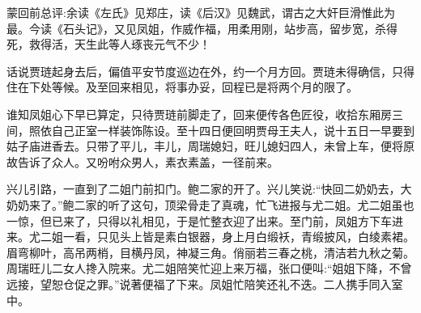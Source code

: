 

\begin{parag}
    \begin{note}蒙回前总评:余读《左氏》见郑庄，读《后汉》见魏武，谓古之大奸巨滑惟此为最。今读《石头记》，又见凤姐，作威作福，用柔用刚，站步高，留步宽，杀得死，救得活，天生此等人琢丧元气不少！\end{note}
\end{parag}


\begin{parag}
    话说贾琏起身去后，偏值平安节度巡边在外，约一个月方回。贾琏未得确信，只得住在下处等候。及至回来相见，将事办妥，回程已是将两个月的限了。
\end{parag}


\begin{parag}
    谁知凤姐心下早已算定，只待贾琏前脚走了，回来便传各色匠役，收拾东厢房三间，照依自己正室一样装饰陈设。至十四日便回明贾母王夫人，说十五日一早要到姑子庙进香去。只带了平儿，丰儿，周瑞媳妇，旺儿媳妇四人，未曾上车，便将原故告诉了众人。又吩咐众男人，素衣素盖，一径前来。
\end{parag}


\begin{parag}
    兴儿引路，一直到了二姐门前扣门。鲍二家的开了。兴儿笑说:“快回二奶奶去，大奶奶来了。”鲍二家的听了这句，顶梁骨走了真魂，忙飞进报与尤二姐。尤二姐虽也一惊，但已来了，只得以礼相见，于是忙整衣迎了出来。至门前，凤姐方下车进来。尤二姐一看，只见头上皆是素白银器，身上月白缎袄，青缎披风，白绫素裙。眉弯柳叶，高吊两梢，目横丹凤，神凝三角。俏丽若三春之桃，清洁若九秋之菊。周瑞旺儿二女人搀入院来。尤二姐陪笑忙迎上来万福，张口便叫:“姐姐下降，不曾远接，望恕仓促之罪。”说著便福了下来。凤姐忙陪笑还礼不迭。二人携手同入室中。
\end{parag}


